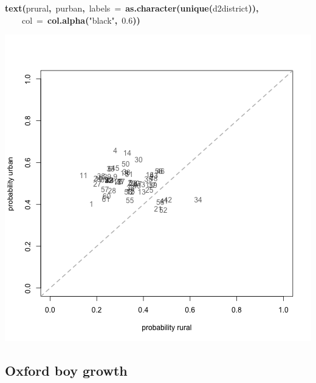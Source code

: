 \documentclass{article}
\makeatletter
\newcommand{\hlnumber}[1]{\textcolor[rgb]{0,0,0}{#1}}%
\newcommand{\hlfunctioncall}[1]{\textcolor[rgb]{.5,0,.33}{\textbf{#1}}}%
\newcommand{\hlstring}[1]{\textcolor[rgb]{.6,.6,1}{#1}}%
\newcommand{\hlkeyword}[1]{\textbf{#1}}%
\newcommand{\hlargument}[1]{\textcolor[rgb]{.69,.25,.02}{#1}}%
\newcommand{\hlsymbol}[1]{#1}%
\newcommand{\hlstd}[1]{\textcolor[rgb]{0,0,0}{#1}}%
\newenvironment{kframe}{%
 \def\FrameCommand##1{\hskip\@totalleftmargin \hskip-\fboxsep
 \colorbox{shadecolor}{##1}\hskip-\fboxsep
     \hskip-\linewidth \hskip-\@totalleftmargin \hskip\columnwidth}%
 \MakeFramed {\advance\hsize-\width
   \@totalleftmargin\z@ \linewidth\hsize
   \@setminipage}}%
 {\par\unskip\endMakeFramed}
\newenvironment{knitrout}{}{} %
\makeatother
\begin{document}
\begin{knitrout}
{\begin{kframe}
\begin{flushleft}
\hlstd{}\hlfunctioncall{text}\hlkeyword{(}\hlsymbol{p\usebox{\hlnormalsizeboxunderscore}rural}\hlkeyword{,}{\ }\hlsymbol{p\usebox{\hlnormalsizeboxunderscore}urban}\hlkeyword{,}{\ }\hlargument{labels}{\ }\hlargument{=}{\ }\hlfunctioncall{as.character}\hlkeyword{(}\hlfunctioncall{unique}\hlkeyword{(}\hlsymbol{d2}\hlkeyword{\usebox{\hlnormalsizeboxdollar}}\hlsymbol{district}\hlkeyword{)}\hlkeyword{)}\hlkeyword{,}\hspace*{\fill}\\
\hlstd{}{\ }{\ }{\ }{\ }\hlargument{col}{\ }\hlargument{=}{\ }\hlfunctioncall{col.alpha}\hlkeyword{(}\hlstring{"black"}\hlkeyword{,}{\ }\hlnumber{0.6}\hlkeyword{)}\hlkeyword{)}\mbox{}
\normalfont
\end{flushleft}
\includegraphics{urban-plot2} \end{kframe}}
\end{knitrout}



\subsection*{Oxford boy growth}
\end{document}
